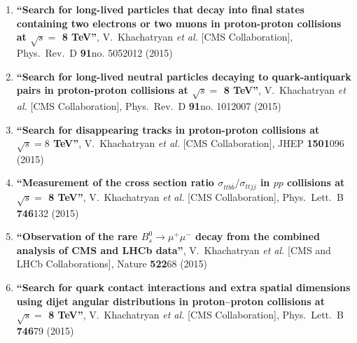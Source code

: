 \begin{enumerate}
\item%
{\bf ``Search for long-lived particles that decay into final states containing two electrons or two muons in proton-proton collisions at $\sqrt{s} =$ 8 TeV''}, 
  V.~Khachatryan {\it et al.}  [CMS Collaboration], 
Phys.\ Rev.\ D {\bf 91}no. 5052012 (2015) %


\item%
{\bf ``Search for long-lived neutral particles decaying to quark-antiquark pairs in proton-proton collisions at $\sqrt{s} =$ 8 TeV''}, 
  V.~Khachatryan {\it et al.}  [CMS Collaboration], 
Phys.\ Rev.\ D {\bf 91}no. 1012007 (2015) %


\item%
{\bf ``Search for disappearing tracks in proton-proton collisions at $ \sqrt{s}=8 $ TeV''}, 
  V.~Khachatryan {\it et al.}  [CMS Collaboration], 
JHEP {\bf 1501}096 (2015) %


\item%
{\bf ``Measurement of the cross section ratio $\sigma_{ttb\bar{b}}/\sigma_{ttjj}$ in $pp$ collisions at $\sqrt{s} =$ 8 TeV''}, 
  V.~Khachatryan {\it et al.}  [CMS Collaboration], 
Phys.\ Lett.\ B {\bf 746}132 (2015) %


\item%
{\bf ``Observation of the rare $B^0_s\to\mu^+\mu^-$ decay from the combined analysis of CMS and LHCb data''}, 
  V.~Khachatryan {\it et al.}  [CMS and LHCb Collaborations], 
Nature {\bf 522}68 (2015) %


\item%
{\bf ``Search for quark contact interactions and extra spatial dimensions using dijet angular distributions in proton–proton collisions at $\sqrt{s} =$ 8 TeV''}, 
  V.~Khachatryan {\it et al.}  [CMS Collaboration], 
Phys.\ Lett.\ B {\bf 746}79 (2015) %



\end{enumerate}
